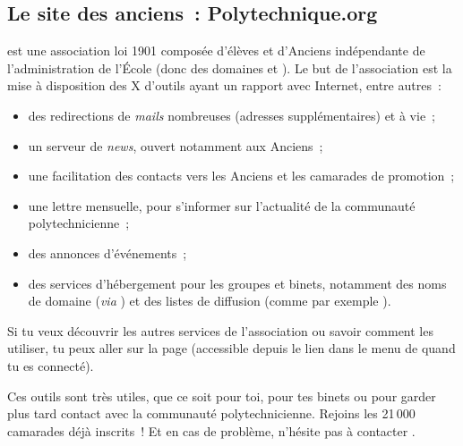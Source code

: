 \subsection{Le site des anciens~: Polytechnique.org}

 est une association loi 1901 composée d'élèves et d'Anciens
 indépendante de l'administration de l'École (donc des domaines 
 et ). Le but de l'association est la mise à disposition des X d'outils
ayant un rapport avec Internet, entre autres~:

\begin{itemize}
  \item des redirections de \emph{mails} nombreuses (adresses supplémentaires) et à vie~;
  \item un serveur de \emph{news}, ouvert notamment aux Anciens~;
  \item une facilitation des contacts vers les Anciens et les camarades de promotion~;
  \item une lettre mensuelle, pour s'informer sur l'actualité de la communauté polytechnicienne~;
  \item des annonces d'événements~;
  \item des services d'hébergement pour les groupes et binets, notamment des noms de domaine (\emph{via} ) et des listes de diffusion (comme par exemple ).
\end{itemize}
Si tu veux découvrir les autres services de l'association ou savoir
comment les utiliser, tu peux aller sur la page
 (accessible depuis
le lien  dans le menu de 
quand tu es connecté).


 Ces outils sont très utiles, que
ce soit pour toi, pour tes binets ou pour garder plus tard contact avec la communauté polytechnicienne. Rejoins
les 21\,000 camarades déjà inscrits~! Et en cas de problème, n'hésite pas à contacter
.
